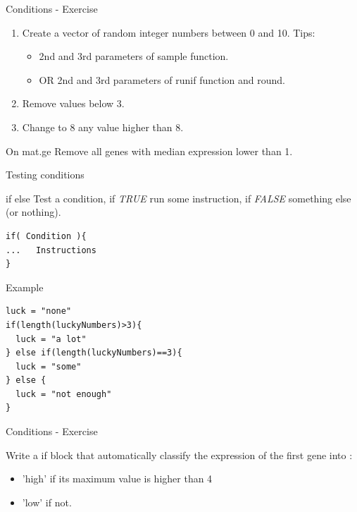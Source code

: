 \documentclass[10pt]{beamer}
\begin{document}
\begin{frame}{Conditions - Exercise}
  \begin{block}{}
    \begin{enumerate}
    \item Create a vector of random integer numbers between 0 and 10.
      {\tiny Tips:}
      \begin{itemize}
      \item {\tiny 2nd and 3rd parameters of {\sf sample} function.}
      \item {\tiny OR 2nd and 3rd parameters of {\sf runif} function and {\sf round}.}
      \end{itemize}
    \item Remove values below $3$.
    \item Change to 8 any value higher than 8.
    \end{enumerate}
  \end{block}
  \begin{block}{On {\sf mat.ge}}
    Remove all genes with median expression lower than 1.
  \end{block}
\end{frame}


\begin{frame}[fragile]{Testing conditions}
  \begin{block}{{\sf if else}}
    Test a condition, if {\it TRUE} run some instruction, if {\it FALSE} something else (or nothing).
\begin{verbatim}
if( Condition ){
...   Instructions
} 
\end{verbatim}  
  \end{block}
  \begin{exampleblock}{Example}
\begin{verbatim}
luck = "none"
if(length(luckyNumbers)>3){
  luck = "a lot"
} else if(length(luckyNumbers)==3){
  luck = "some"
} else {
  luck = "not enough"
}
\end{verbatim}  
  \end{exampleblock}
\end{frame}

\begin{frame}{Conditions - Exercise}
  \begin{block}{}
    Write a {\sf if} block that automatically classify the expression of the first gene into :
    \begin{itemize}
    \item 'high' if its maximum value is higher than 4
    \item 'low' if not.
    \end{itemize}
  \end{block}
\end{frame}
\end{document}

